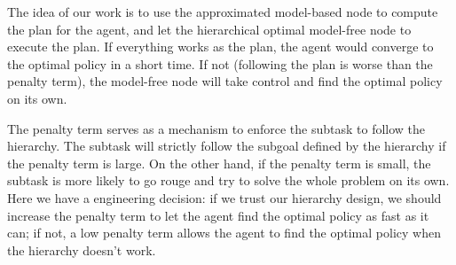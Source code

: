 

The idea of our work is to use the approximated model-based node to 
compute the plan for the agent, and let the hierarchical optimal model-free node
to execute the plan. If everything works as the plan, the agent would converge to the optimal
policy in a short time. If not (following the plan is worse than the penalty term),
the model-free node will take control and find the optimal policy on its own.

The penalty term serves as a mechanism to enforce the subtask to follow the hierarchy.
The subtask will strictly follow the subgoal defined by the hierarchy if the penalty term is large.
On the other hand, if the penalty term is small, the subtask is more likely to go rouge and try to 
solve the whole problem on its own. Here we have a engineering decision: if we trust our hierarchy design, 
we should increase the penalty term to let the agent find the optimal policy as fast as it can; 
if not, a low penalty term allows the agent to find the optimal policy when the hierarchy doesn't work.






